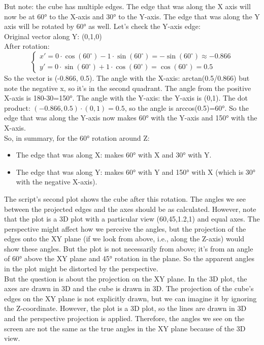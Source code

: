 \documentclass[a4paper,10pt]{article}
\begin{document}
\begin{enumerate}
But note: the cube has multiple edges. The edge that was along the X axis will now be at 60° to the X-axis and 30° to the Y-axis. The edge that was along the Y axis will be rotated by 60° as well. Let's check the Y-axis edge:\\
Original vector along Y: (0,1,0)\\
After rotation:
\[
\begin{cases}
x' = 0\cdot \cos(60^{\circ}) - 1\cdot \sin(60^{\circ}) = -\sin(60^{\circ}) \approx -0.866\\
y' = 0\cdot \sin(60^{\circ}) + 1\cdot \cos(60^{\circ}) =  \cos(60^{\circ}) = 0.5
\end{cases}
\]
So the vector is (-0.866, 0.5). The angle with the X-axis: arctan(0.5/0.866) but note the negative x, so it's in the second quadrant. The angle from the positive X-axis is 180-30=150°. The angle with the Y-axis: the Y-axis is (0,1). The dot product: $(-0.866,0.5)\cdot(0,1)=0.5$, so the angle is arccos(0.5)=60°. So the edge that was along the Y-axis now makes 60° with the Y-axis and 150° with the X-axis.\\
So, in summary, for the 60° rotation around Z:
\begin{itemize}
\item The edge that was along X: makes 60° with X and 30° with Y.
\item  The edge that was along Y: makes 60° with Y and 150° with X (which is 30° with the negative X-axis).
\end{itemize}
 The script's second plot shows the cube after this rotation. The angles we see between the projected edges and the axes should be as calculated.
 However, note that the plot is a 3D plot with a particular view (60,45,1.2,1) and equal axes. The perspective might affect how we perceive the angles, but the projection of the edges onto the XY plane (if we look from above, i.e., along the Z-axis) would show these angles. But the plot is not necessarily from above; it's from an angle of 60° above the XY plane and 45° rotation in the plane. So the apparent angles in the plot might be distorted by the perspective.\\
But the question is about the projection on the XY plane. In the 3D plot, the axes are drawn in 3D and the cube is drawn in 3D. The projection of the cube's edges on the XY plane is not explicitly drawn, but we can imagine it by ignoring the Z-coordinate. However, the plot is a 3D plot, so the lines are drawn in 3D and the perspective projection is applied. Therefore, the angles we see on the screen are not the same as the true angles in the XY plane because of the 3D view.\\

\end{enumerate}
\end{document}

